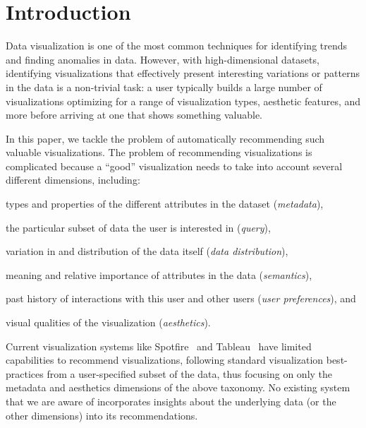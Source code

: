 
\section{Introduction}
\label{sec:introduction}


Data visualization is one of the most common techniques for identifying 
trends and finding anomalies in data.
However, with high-dimensional datasets, identifying visualizations that 
effectively present interesting variations or patterns in the data is a non-trivial task:  a
user typically builds a large number of visualizations optimizing for a range of visualization 
types, aesthetic features, and more
before arriving at one that shows something valuable.


In this paper, we tackle the problem of automatically recommending such valuable visualizations.
The problem of recommending visualizations is complicated because a ``good'' visualization needs to take into account several different dimensions, including:
\begin{inparaenum}
\item types and properties of the different attributes in the dataset ({\it metadata}), 
\item the particular subset of data the user is interested in ({\it query}), 
\item variation in and distribution of the data itself ({\it data distribution}), 
\item meaning and relative importance of attributes in the data ({\it semantics}), 
\item past history of interactions with this user and other users ({\it user preferences}), and
\item visual qualities of the visualization ({\it aesthetics}). 
\end{inparaenum}

Current visualization systems like Spotfire~\cite{} and Tableau~\cite{} have limited capabilities to recommend visualizations, following standard visualization best-practices from a user-specified subset of the data, thus focusing on only the metadata and aesthetics  
dimensions of the above taxonomy.  No existing system that we are aware of 
incorporates insights about the underlying data (or the other dimensions) into its recommendations.

